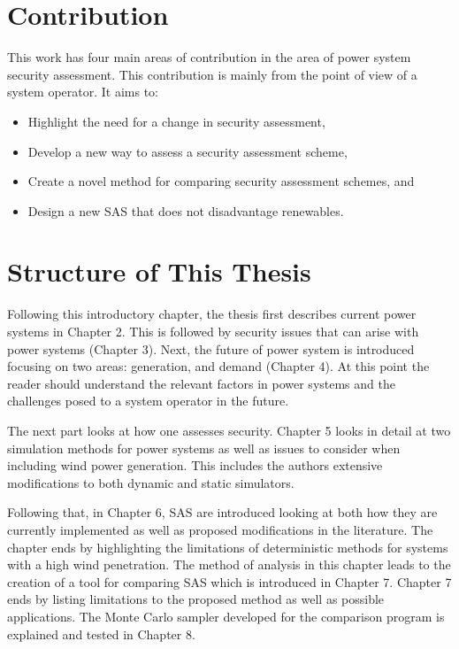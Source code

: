 \documentclass[a4paper,oneside,12pt]{report}
\begin{document}
\section{Contribution}

This work has four main areas of contribution in the area of power system security assessment. This contribution is mainly from the point of view of a system operator. It aims to:

\begin{itemize}
\item Highlight the need for a change in security assessment,
\item Develop a new way to assess a security assessment scheme,
\item Create a novel method for comparing security assessment schemes, and
\item Design a new SAS that does not disadvantage renewables.
\end{itemize}

\section{Structure of This Thesis}

Following this introductory chapter, the thesis first describes current power systems in Chapter 2. This is followed by security issues that can arise with power systems (Chapter 3). Next, the future of power system is introduced focusing on two areas: generation, and demand (Chapter 4). At this point the reader should understand the relevant factors in power systems and the challenges posed to a system operator in the future.

The next part looks at how one assesses security. Chapter 5 looks in detail at two simulation methods for power systems as well as issues to consider when including wind power generation. This includes the authors extensive modifications to both dynamic and static simulators.

Following that, in Chapter 6, SAS are introduced looking at both how they are currently implemented as well as proposed modifications in the literature. The chapter ends by highlighting the limitations of deterministic methods for systems with a high wind penetration. The method of analysis in this chapter leads to the creation of a tool for comparing SAS which is introduced in Chapter 7. Chapter 7 ends by listing limitations to the proposed method as well as possible applications. The Monte Carlo sampler developed for the comparison program is explained and tested in Chapter 8.
\end{document}
